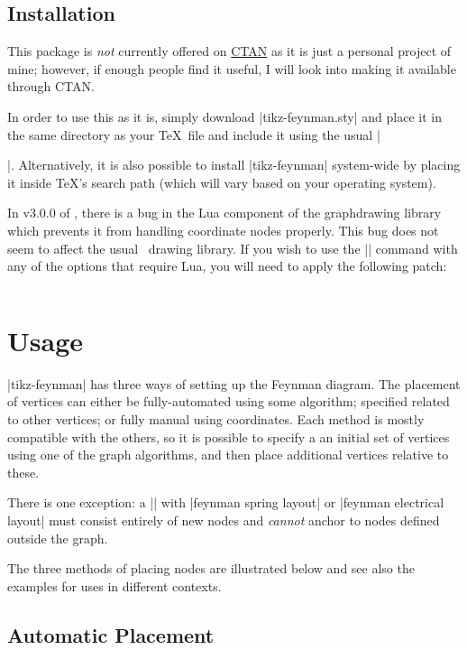 \documentclass[a4paper,final]{ltxdoc}
\begin{document}
\subsection{Installation}
\label{subsec:installation}

This package is \emph{not} currently offered on
\href{https://www.ctan.org}{CTAN} as it is just a personal project of mine;
however, if enough people find it useful, I will look into making it available
through CTAN.

In order to use this as it is, simply download |tikz-feynman.sty| and place it
in the same directory as your \TeX~file and include it using the usual
|\usepackage{tikz-feynman}|.  Alternatively, it is also possible to install
|tikz-feynman| system-wide by placing it inside \TeX's search path (which will
vary based on your operating system).

In v3.0.0 of \tikzname, there is a bug in the Lua component of the graphdrawing
library which prevents it from handling coordinate nodes properly.  This bug
does not seem to affect the usual \tikzname~drawing library.  If you wish to use the
|\graph| command with any of the options that require Lua, you will need to
apply the following patch:

\inputminted[fontsize=\footnotesize, bgcolor=codebackground]{diff}{pgf.patch}


\newpage
\section{Usage}
\label{sec:usage}

|tikz-feynman| has three ways of setting up the Feynman diagram.  The placement
of vertices can either be fully-automated using some algorithm; specified
related to other vertices; or fully manual using coordinates.  Each method is
mostly compatible with the others, so it is possible to specify a an initial
set of vertices using one of the graph algorithms, and then place additional
vertices relative to these.

There is one exception: a |\graph| with |feynman spring layout| or |feynman
 electrical layout| must consist entirely of new nodes and \emph{cannot} anchor
to nodes defined outside the graph.

The three methods of placing nodes are illustrated below and see also the
examples for uses in different contexts.


\subsection{Automatic Placement}
\label{subsec:automatic_placement}
\end{document}
